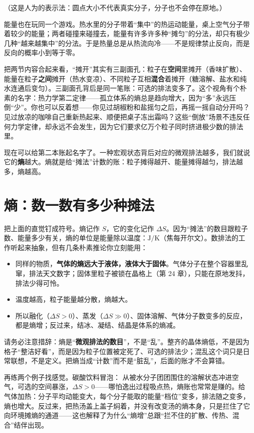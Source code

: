（这是人为的表示法：圆点大小不代表真实分子，分子也不会停在原地。）

能量也在玩同一个游戏。热水里的分子带着“集中”的热运动能量，桌上空气分子带着较少的能量；两者碰撞来碰撞去，能量有许多许多种“摊匀”的分法，却只有极少几种“越来越集中”的分法。于是热量总是从热流向冷——不是规律禁止反向，而是反向的概率小到等于零。

把两节内容合起来看，“摊开”其实有三副面孔：粒子在\textbf{空间}里摊开（香味扩散）、能量在粒子\textbf{之间}摊开（热水变凉）、不同粒子互相\textbf{混合}着摊开（糖溶解、盐水和纯水连通后变匀）。三副面孔背后是同一笔账：可选的排法变多了。这个视角有个朴素的名字：热力学第二定律——孤立体系的熵总是趋向增大，因为“多”永远压倒“少”。你也可以反着想——你见过胡椒粉和盐摇匀之后，再摇一摇自动分开吗？见过放凉的咖啡自己重新热起来、顺便把桌子冻出霜吗？这些“倒放”场景不违反任何力学定律，却永远不会发生，因为它们要求亿万个粒子同时挤进极少数的排法里。

现在可以给第二本账起名字了。一种宏观状态背后对应的微观排法越多，我们就说它的\textbf{熵}越大。熵就是给“摊法”计数的账：粒子摊得越开、能量摊得越匀，排法越多，熵越高。

\section{熵：数一数有多少种摊法}

把上面的直觉钉成符号。熵记作 $S$，它的变化记作 $\Delta S$。因为“摊法”的数目跟粒子数、能量多少有关，熵的单位是能量除以温度：$\mathrm{J/K}$（焦每开尔文）。数排法的工作听起来抽象，但有几条朴素推论你立刻能用：

\begin{itemize}[itemsep=2pt]
\item 同样的物质，\textbf{气体的熵远大于液体，液体大于固体}。气体分子在整个容器里乱窜，排法天文数字；固体里粒子被锁在晶格上（第 24 章），只能在原地发抖，排法少得可怜。
\item 温度越高，粒子能量越分散，熵越大。
\item 所以融化（$\Delta S>0$）、蒸发（$\Delta S\gg 0$）、固体溶解、气体分子数变多的反应，都是熵增；反过来，结冰、凝结、结晶是体系的熵减。
\end{itemize}

请务必注意措辞：熵是“\textbf{微观排法的数目}”，不是“乱”。整齐的晶体熵低，不是因为格子“整洁好看”，而是因为粒子位置被定死了、可选的排法少；混乱这个词只是日常联想，不是定义。把熵当成“计数”而不是“脏乱”，后面的账才不会算错。

再练两个例子找感觉。碳酸饮料冒泡： 从被水分子团团围住的溶解状态冲进空气，可选的空间暴涨，$\Delta S>0$——哪怕逸出过程吸点热，熵账也常常是赚的。给气体加热：分子平均动能变大，每个分子能取的能量“档位”变多，排法随之变多，熵也增大。反过来，把热汤盖上盖子焖着，并没有改变汤的熵本身，只是拦住了它向环境摊熵的通道——这也解释了为什么“熵增”总跟“拦不住的扩散、传热、混合”结伴出现。

